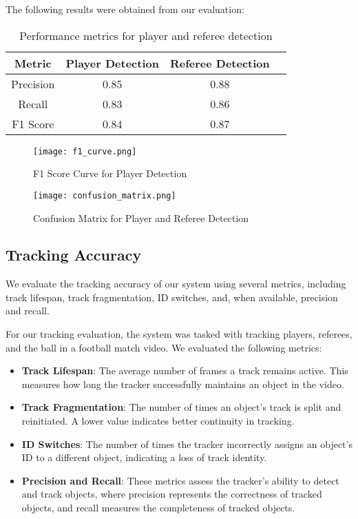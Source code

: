 The following results were obtained from our evaluation:

\begin{table}[h]
    \centering
    \begin{tabular}{|c|c|c|c|}
    \hline
    \textbf{Metric} & \textbf{Player Detection} & \textbf{Referee Detection} \\
    \hline
    Precision & 0.85 & 0.88 \\
    Recall & 0.83 & 0.86 \\
    F1 Score & 0.84 & 0.87 \\
    \hline
    \end{tabular}
    \caption{Performance metrics for player and referee detection}
    \label{tab:player_detection_metrics}
\end{table}

\begin{figure}[ht]
    \centering
    \texttt{[image: f1\_curve.png]}
    \caption{F1 Score Curve for Player Detection}
    \label{fig:f1_curve}
\end{figure}

\begin{figure}[ht]
    \centering
    \texttt{[image: confusion\_matrix.png]}
    \caption{Confusion Matrix for Player and Referee Detection}
    \label{fig:confusion_matrix}
\end{figure}

\subsection{Tracking Accuracy}

We evaluate the tracking accuracy of our system using several metrics, including track lifespan, track fragmentation, ID switches, and, when available, precision and recall.

For our tracking evaluation, the system was tasked with tracking players, referees, and the ball in a football match video. We evaluated the following metrics:

\begin{itemize}
    \item \textbf{Track Lifespan}: The average number of frames a track remains active. This measures how long the tracker successfully maintains an object in the video.
    \item \textbf{Track Fragmentation}: The number of times an object’s track is split and reinitiated. A lower value indicates better continuity in tracking.
    \item \textbf{ID Switches}: The number of times the tracker incorrectly assigns an object’s ID to a different object, indicating a loss of track identity.
    \item \textbf{Precision and Recall}: These metrics assess the tracker’s ability to detect and track objects, where precision represents the correctness of tracked objects, and recall measures the completeness of tracked objects.
\end{itemize}

